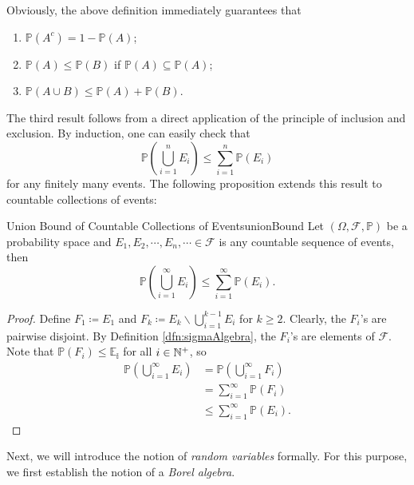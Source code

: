 \documentclass[math, code]{amznotes}
\theoremstyle{remark}
\begin{document}
Obviously, the above definition immediately guarantees that 
\begin{enumerate}
    \item $\mathbb{P}\left(A^c\right) = 1 - \mathbb{P}\left(A\right)$;
    \item $\mathbb{P}\left(A\right) \leq \mathbb{P}\left(B\right)$ if $\mathbb{P}\left(A\right) \subseteq \mathbb{P}\left(A\right)$;
    \item $\mathbb{P}\left(A \cup B\right) \leq \mathbb{P}\left(A\right) + \mathbb{P}\left(B\right)$.
\end{enumerate}
The third result follows from a direct application of the principle of inclusion and exclusion. By induction, one can easily check that 
\begin{equation*}
    \mathbb{P}\left(\bigcup_{i = 1}^{n}E_i\right) \leq \sum_{i = 1}^{n}\mathbb{P}\left(E_i\right)
\end{equation*}
for any finitely many events. The following proposition extends this result to countable collections of events:
\begin{probox}{Union Bound of Countable Collections of Events}{unionBound}
    Let $\left(\Omega, \mathcal{F}, \mathbb{P}\right)$ be a probability space and $E_1, E_2, \cdots, E_n, \cdots \in \mathcal{F}$ is any countable sequence of events, then 
    \begin{equation*}
        \mathbb{P}\left(\bigcup_{i = 1}^{\infty}E_i\right) \leq \sum_{i = 1}^{\infty}\mathbb{P}\left(E_i\right).
    \end{equation*}
    \tcblower
    \begin{proof}
        Define $F_1 \coloneqq E_1$ and $F_k \coloneqq E_k \backslash \bigcup_{i = 1}^{k - 1}E_i$ for $k \geq 2$. Clearly, the $F_i$'s are pairwise disjoint. By Definition \ref{dfn:sigmaAlgebra}, the $F_i$'s are elements of $\mathcal{F}$. Note that $\mathbb{P}\left(F_i\right) \leq \mathbb{E_i}$ for all $i \in \mathbb{N}^+$, so 
        \begin{align*}
            \mathbb{P}\left(\bigcup_{i = 1}^{\infty}E_i\right) & = \mathbb{P}\left(\bigcup_{i = 1}^{\infty}F_i\right) \\
            & = \sum_{i = 1}^{\infty}\mathbb{P}\left(F_i\right) \\
            & \leq \sum_{i = 1}^{\infty}\mathbb{P}\left(E_i\right).
        \end{align*}
    \end{proof}
\end{probox}
Next, we will introduce the notion of \textit{random variables} formally. For this purpose, we first establish the notion of a \textit{Borel algebra}.
\end{document}
